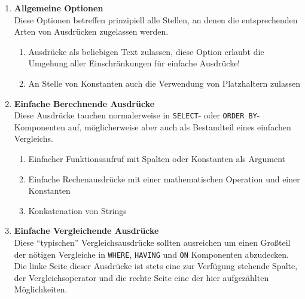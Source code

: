 \begin{enumerate}
\item \textbf{Allgemeine Optionen} \\
  Diese Optionen betreffen prinzipiell alle Stellen, an denen die entsprechenden Arten von Ausdrücken zugelassen werden.
  \begin{enumerate}
  \item \label{feat:expr-allow-any-text} Ausdrücke als beliebigen Text zulassen, diese Option erlaubt die Umgehung aller Einschränkungen für einfache Ausdrücke!
  \item \label{feat:expr-allow-placeholder} An Stelle von Konstanten auch die Verwendung von Platzhaltern zulassen
  \end{enumerate}

\item \label{feat:expr-compute}  \textbf{Einfache Berechnende Ausdrücke} \\
  Diese Ausdrücke tauchen normalerweise in \texttt{SELECT}- oder \texttt{ORDER BY}-Komponenten auf, möglicherweise aber auch als Bestandteil eines einfachen Vergleichs.
  \begin{enumerate}
      \item \label{feat:expr-compute-simple-func} Einfacher Funktionsaufruf mit Spalten oder Konstanten als Argument
      \item \label{feat:expr-compute-simple-arithmetic} Einfache Rechenausdrücke mit einer mathematischen Operation und einer Konstanten
      \item \label{feat:expr-compute-simple-concat} Konkatenation von Strings
  \end{enumerate}

\item \textbf{Einfache Vergleichende Ausdrücke} \\
  Diese ``typischen'' Vergleichsausdrücke sollten ausreichen um einen Großteil der nötigen Vergleiche in \texttt{WHERE}, \texttt{HAVING} und \texttt{ON} Komponenten abzudecken. Die linke Seite dieser Ausdrücke ist stets eine zur Verfügung stehende Spalte, der Vergleichsoperator und die rechte Seite eine der hier aufgezählten Möglichkeiten.


\end{enumerate}

